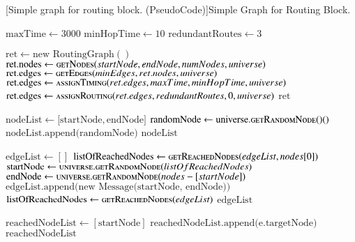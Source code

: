 \begin{breakablealgorithm}
	[Simple graph for routing block. (PseudoCode)]{Simple Graph for Routing Block.}\label{alg:simpleGraph}
	\begin{algorithmic}[1]
		\label{alg:getRoutingGraph-line}
		\State $\text{maxTime} \gets 3000$
		\State $\text{minHopTime} \gets 10$
		\State $\text{redundantRoutes} \gets 3$
		\item[]
		\State $\text{ret} \gets \text{new RoutingGraph}()$
		\State $\text{ret.nodes} \gets \Call{getNodes}{startNode, endNode, numNodes, universe}$
		\State $\text{ret.edges} \gets \Call{getEdges}{minEdges, ret.nodes, universe}$
		\State $\text{ret.edges} \gets \Call{assignTiming}{ret.edges, maxTime, minHopTime, universe}$
		\State $\text{ret.edges} \gets \Call{assignRouting}{ret.edges, redundantRoutes, 0, universe}$
		\Return $\text{ret}$	
		\EndFunction
		\item[]		
		\label{alg:getNodes-line}
		\State $\text{nodeList} \gets \lbrack\text{startNode}, \text{endNode}\rbrack$
		\State $\text{randomNode} \gets \text{universe}.\Call{getRandomNode()}$
		\State $\text{nodeList.append(randomNode)}$ 
		\EndIf	
		\EndWhile{}	
		\Return $\text{nodeList}$
		\EndFunction  
		\item[]
		\label{alg:getEdges-line}
		\State $\text{edgeList} \gets []$
		\State $\text{listOfReachedNodes} \gets \Call{getReachedNodes}{edgeList, nodes[0]}$
		\State $\text{startNode} \gets \Call{universe.getRandomNode}{listOfReachedNodes}$
		\State $\text{endNode} \gets \Call{universe.getRandomNode}{nodes-[startNode]}$
		\State $\text{edgeList.append(new Message(startNode, endNode))}$
		\State $\text{listOfReachedNodes} \gets \Call{getReachedNodes}{edgeList}$
		\EndWhile{}
		\Return $\text{edgeList}$
		\EndFunction
		\item[]
		\label{alg:getReachedNodes-line}
		\State $\text{reachedNodeList} \gets [\text{startNode}]$
		\State $\text{reachedNodeList.append(e.targetNode)}$
		\EndIf
		\EndFor
		\Return $\text{reachedNodeList}$
		\EndFunction
	\end{algorithmic}
\end{breakablealgorithm}

